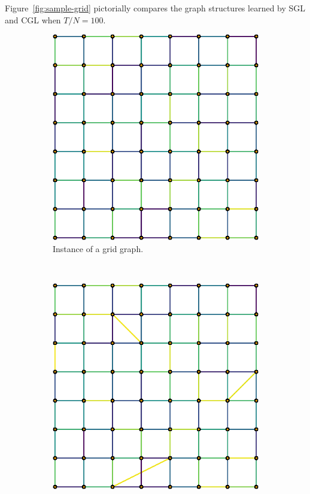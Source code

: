 Figure~\ref{fig:sample-grid} pictorially compares the graph structures learned by \textsf{SGL} and \textsf{CGL} when
$T/N = 100$.

\begin{figure}[!htb]
    \centering
    \begin{subfigure}[b]{0.3\textwidth}
        \includegraphics[width=\textwidth]{grid/true_grid.eps}
        \caption{Instance of a grid graph.}
    \end{subfigure}
    ~ %
    \begin{subfigure}[b]{0.3\textwidth}
        \includegraphics[width=\textwidth]{grid/sgl_grid.eps}

\end{subfigure}
\end{figure}
